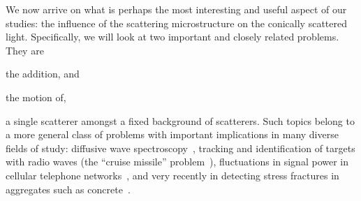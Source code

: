 We now arrive on what is perhaps the most interesting and useful aspect of our
studies: the influence of the scattering microstructure on the conically
scattered light.  Specifically, we will look at two important and closely
related problems.  They are%
\begin{inparaenum}[(a)]
\item the addition, and
\item the motion of,
\end{inparaenum} %
a single scatterer amongst a fixed background of scatterers.  Such topics
belong to a more general class of problems with important implications in
many diverse fields of study: diffusive wave
spectroscopy~\cite{pine1988diffusing}, tracking and identification of
targets with radio waves (the ``cruise missile''
problem~\cite{atkins1991neural}), fluctuations in signal power in cellular
telephone networks~\cite{abdi2001estimation}, and very recently in
detecting stress fractures in aggregates such as
concrete~\cite{larose2010locating}.
